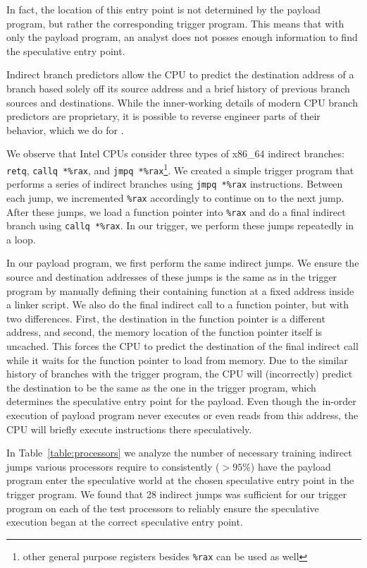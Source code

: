 In fact, the location of this entry point is not determined by the payload
program, but rather the corresponding trigger program. This means that with only
the payload program, an analyst does not posses enough information to find the
speculative entry point.

Indirect branch predictors allow the CPU to predict the destination address of a
branch based solely off its source address and a brief history of previous
branch sources and destinations. While the inner-working details of modern CPU
branch predictors are proprietary, it is possible to reverse engineer parts of
their behavior, which we do for \speculake.

We observe that Intel CPUs consider three types of x86\_64 indirect branches:
\texttt{retq}, \texttt{callq *\%rax}, and \texttt{jmpq *\%rax}\footnote{other
general purpose registers besides \texttt{\%rax} can be used as well}. We
created a simple trigger program that performs a series of indirect branches
using \texttt{jmpq *\%rax} instructions.
Between each
jump, we incremented \texttt{\%rax} accordingly to continue on to the next jump.
After these jumps, we load a function pointer into \texttt{\%rax} and do a
final indirect branch using \texttt{callq *\%rax}. In our trigger, we perform
these jumps repeatedly in a loop.


In our payload program, we first perform the same indirect jumps. We ensure
the source and destination addresses of these jumps is the same as in the
trigger program by manually defining their containing function at a fixed
address inside a linker script. We also do the final indirect call to a function
pointer, but with two differences. First, the destination in the function
pointer is a different address, and second, the memory location of the function
pointer itself is uncached. This forces the CPU to predict the destination of
the final indirect call while it waits for the function pointer to load from
memory. Due to the similar history of branches with the trigger program, the CPU
will (incorrectly) predict the destination to be the same as the one in the
trigger program, which determines the speculative entry point for the payload.
Even though the in-order execution of payload program never executes or even
reads from this address, the CPU will briefly execute instructions there
speculatively. 

\processorTable

In Table~\ref{table:processors} we analyze the number of necessary training
indirect jumps various processors require to consistently ($> 95\%$) have the
payload program enter the speculative world at the chosen speculative entry
point in the trigger program. We found that 28 indirect jumps was sufficient for
our trigger program on each of the test processors to reliably ensure the
speculative execution began at the correct speculative entry point.

